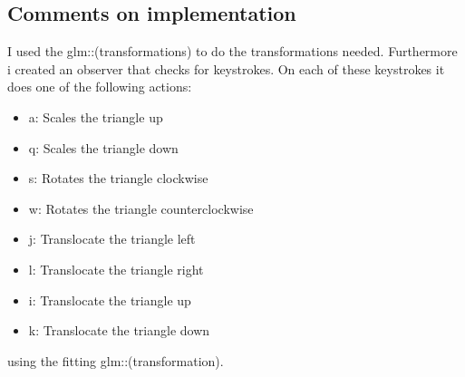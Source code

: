 \documentclass{article}
\begin{document}
\subsection{Comments on implementation}

I used the glm::(transformations) to do the transformations needed.
Furthermore i created an observer that checks for keystrokes. On each of these
keystrokes it does one of the following actions:
\begin{itemize}
    \item{a:} Scales the triangle up 
    \item{q:} Scales the triangle down
    \item{s:} Rotates the triangle clockwise
    \item{w:} Rotates the triangle counterclockwise
    \item{j:} Translocate the triangle left
    \item{l:} Translocate the triangle right 
    \item{i:} Translocate the triangle up
    \item{k:} Translocate the triangle down 
\end{itemize}
using the fitting glm::(transformation).
\end{document}
